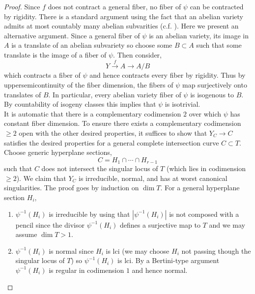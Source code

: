 \documentclass[12pt]{article}
\begin{document}
\begin{proof}
Since $f$ does not contract a general fiber, no fiber of $\psi$ can be contracted by rigidity. There is a standard argument using the fact that an abelian variety admits at most countably many abelian subvarities (c.f. \cite[Thm. 13]{kawamata_abelian_varieties}). Here we present an alternative argument. Since a general fiber of $\psi$ is an abelian variety, its image in $A$ is a translate of an abelian subvariety so choose some $B \subset A$ such that some translate is the image of a fiber of $\psi$. Then consider,
\[ Y \xrightarrow{f} A \to A / B \]
which contracts a fiber of $\psi$ and hence contracts every fiber by rigidity. Thus by uppersemicontinuity of the fiber dimension, the fibers of $\psi$ map surjectively onto translates of $B$. In particular, every abelian variety fiber of $\psi$ is isogenous to $B$. By countability of isogeny classes this implies that $\psi$ is isotrivial. 
\bigskip\\
It is automatic that there is a complementary codimension $2$ over which $\psi$ has constant fiber dimension. To ensure there exists a complementary codimension $\ge 2$ open with the other desired properties, it suffices to show that $Y_{C} \to C$ satisfies the desired properties for a general complete intersection curve $C \subset T$. Choose generic hyperplane sections,
\[ C = H_1 \cap \cdots \cap H_{r-1} \]
such that $C$ does not intersect the singular locus of $T$ (which lies in codimension $\ge 2$). We claim that $Y_C$ is irreducible, normal, and has at worst canonical singularities. The proof goes by induction on $\dim{T}$. For a general hyperplane section $H_i$,
\begin{enumerate}
\item $\psi^{-1}(H_i)$ is irreducible by \cite[Thm 3.4.10]{Flenner-Carroll-Vogel} using that $|\psi^{-1}(H_i)|$ is not composed with a pencil since the divisor $\psi^{-1}(H_i)$ defines a surjective map to $T$ and we may assume $\dim{T} > 1$.

\item $\psi^{-1}(H_i)$ is normal since $H_i$ is lci (we may choose $H_i$ not passing though the singular locus of $T$) so $\psi^{-1}(H_i)$ is lci. By a Bertini-type argument $\psi^{-1}(H_i)$ is regular in codimension $1$ and hence normal.


\end{enumerate}
\end{proof}
\end{document}
